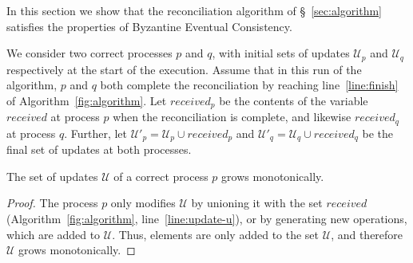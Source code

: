 \documentclass[a4paper,anonymous,USenglish]{lipics-v2019}
\begin{document}
In this section we show that the reconciliation algorithm of \S~\ref{sec:algorithm} satisfies the properties of Byzantine Eventual Consistency.

We consider two correct processes $p$ and $q$, with initial sets of updates $\mathcal{U}_p$ and $\mathcal{U}_q$ respectively at the start of the execution.
Assume that in this run of the algorithm, $p$ and $q$ both complete the reconciliation by reaching line~\ref{line:finish} of Algorithm~\ref{fig:algorithm}.
Let $\mathit{received}_p$ be the contents of the variable $\mathit{received}$ at process $p$ when the reconciliation is complete, and likewise $\mathit{received}_q$ at process $q$.
Further, let $\mathcal{U}'_p = \mathcal{U}_p \cup \mathit{received}_p$ and $\mathcal{U}'_q = \mathcal{U}_q \cup \mathit{received}_q$ be the final set of updates at both processes.

\begin{lemma}\label{lemma:no-p-missing}
The set of updates $\mathcal{U}$ of a correct process $p$ grows monotonically.
\end{lemma}
\begin{proof}
The process $p$ only modifies $\mathcal{U}$ by unioning it with the set $\mathit{received}$ (Algorithm~\ref{fig:algorithm}, line~\ref{line:update-u}), or by generating new operations, which are added to $\mathcal{U}$.
Thus, elements are only added to the set $\mathcal{U}$, and therefore $\mathcal{U}$ grows monotonically.
\end{proof}
\end{document}
